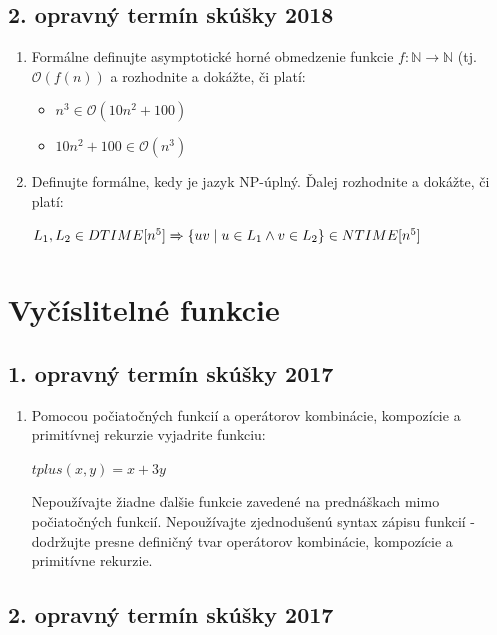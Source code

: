 \documentclass[11pt,a4paper]{article}
\begin{document}
		\subsection{2. opravný termín skúšky 2018}
		
		\begin{enumerate}
			\item Formálne definujte asymptotické horné obmedzenie funkcie $f: \mathbb{N} \rightarrow \mathbb{N}$ (tj. $\mathcal{O}(f(n))$ a rozhodnite a dokážte, či platí:
			
			\begin{itemize}
				\item $n^3 \in \mathcal{O}(10n^2 + 100)$
				\item $10n^2 + 100 \in \mathcal{O}(n^3)$
			\end{itemize}
		
			\item Definujte formálne, kedy je jazyk NP-úplný. Ďalej rozhodnite a dokážte, či platí:
			
			$L_1, L_2 \in DTIME[n^5] \xRightarrow[]{} \{ uv \mid u \in  L_1 \land v \in L_2\} \in NTIME[n^5]$
		\end{enumerate}	

	\section{Vyčíslitelné funkcie}

		\subsection{1. opravný termín skúšky 2017}

		\begin{enumerate}
			\item Pomocou počiatočných funkcií a operátorov kombinácie, kompozície a primitívnej rekurzie vyjadrite funkciu:

			$tplus(x,y) = x + 3y$
	
			Nepoužívajte žiadne ďalšie funkcie zavedené na prednáškach mimo počiatočných funkcií. Nepoužívajte zjednodušenú syntax zápisu funkcií \-- dodržujte presne definičný tvar operátorov kombinácie, kompozície a primitívne rekurzie.
		\end{enumerate}	

		\subsection{2. opravný termín skúšky 2017}
\end{document}
